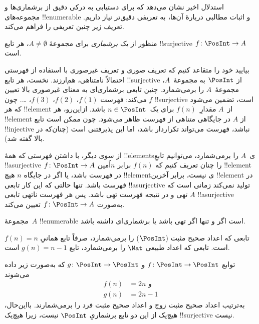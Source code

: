 \documentclass[../../../include/open-logic-section]{subfiles}
\begin{document}
استدلال اخیر نشان می‌دهد که برای دستیابی به درکی دقیق از
برشماری‌ها و مجموعه‌های !!{enumerable} و اثبات مطالبی دربارهٔ آن‌ها،
به تعریفی دقیق‌تر نیاز داریم. تعریف زیر چنین تعریفی را فراهم می‌کند.

\begin{defn}
منظور از یک \emph{برشماری} برای مجموعهٔ $A \neq \emptyset$، هر تابع
!!{surjective} $f \colon \PosInt \to A$ است.
\end{defn}

\begin{explain}
بیایید خود را متقاعد کنیم که تعریف صوری و تعریف غیرصوری با استفاده از
فهرستی احتمالاً نامتناهی، هم‌ارزند. نخست، هر تابع !!{surjective} از
$\PosInt$ به مجموعهٔ~$A$، مجموعهٔ~$A$ را برمی‌شمارد. چنین تابعی
برشماری‌ای به معنای غیرصوری بالا تعیین می‌کند: فهرست $f(1)$، $f(2)$،
$f(3)$، \dots. چون $f$ !!{surjective} است، تضمین می‌شود که هر
!!{element} از~$A$ مقدارِ~$f(n)$ برای یک~$n \in \PosInt$ باشد. ازاین‌رو،
هر !!{element} از $A$ در جایگاهی متناهی از فهرست ظاهر می‌شود. چون ممکن
است تابع !!{injective} نباشد، فهرست می‌تواند تکراردار باشد، اما این
پذیرفتنی است (چنان‌که در بالا گفته شد).

از سوی دیگر، با داشتن فهرستی که همهٔ !!{element}sی~$A$ را
برمی‌شمارد، می‌توانیم تابعِ !!a{surjective} $f\colon \PosInt \to A$ را
چنان تعریف کنیم که $f(n)$ برابر $n$اُمین !!{element} در فهرست باشد، یا اگر
در جایگاه $n$ هیچ !!{element}ی نیست، برابر آخرین !!{element} در فهرست باشد.
تنها حالتی که این کار تابعی !!a{surjective} تولید نمی‌کند زمانی است که
$A$ تهی و در نتیجه فهرست تهی باشد. پس هر فهرست ناتهی تابعی
!!a{surjective} به‌صورت $f\colon \PosInt \to A$ تعیین می‌کند.
\end{explain}

\begin{defn}
  مجموعهٔ~$A$ !!{enumerable} است اگر و تنها اگر تهی باشد یا برشماری‌ای داشته باشد.
\end{defn}

\begin{ex}
تابعی که اعداد صحیح مثبت ($\PosInt$) را برمی‌شمارد، صرفاً تابع همانیِ
$f(n) = n$ است. تابعی که اعداد طبیعی $\Nat$ را برمی‌شمارد، تابع
$g(n) = n - 1$ است.
\end{ex}

\begin{ex}
توابع $f\colon \PosInt \to \PosInt$ و $g \colon \PosInt \to
\PosInt$ که به‌صورت زیر داده می‌شوند
\begin{align*}
f(n) & = 2n \text{ و}\\
g(n) & = 2n - 1
\end{align*}
به‌ترتیب اعداد صحیح مثبت زوج و اعداد صحیح مثبت فرد را برمی‌شمارند.
بااین‌حال، هیچ‌یک از این دو تابع برشماریِ $\PosInt$ نیست، زیرا هیچ‌یک
!!{surjective} نیست.
\end{ex}
\end{document}
